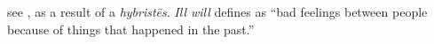 \item[Ill-will,]

see , as a result of a \emph{hybristēs}. \emph{Ill will} defines as ``bad feelings between people because of things that happened in the past.''
